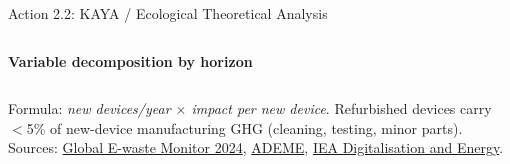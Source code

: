 \documentclass[aspectratio=169]{beamer}
\begin{document}
\begin{frame}{Action 2.2: KAYA / Ecological Theoretical Analysis}
\begin{columns}[T,totalwidth=\textwidth]
\textbf{Variable decomposition by horizon}
\end{columns}
\vspace{0.08cm}
\tiny Formula: \textit{new devices/year $\times$ impact per new device}. Refurbished devices carry $<$5\% of new-device manufacturing GHG (cleaning, testing, minor parts). Sources: \href{https://ewastemonitor.info/the-global-e-waste-monitor-2024/}{Global E-waste Monitor 2024}, \href{https://librairie.ademe.fr/}{ADEME}, \href{https://www.iea.org/reports/digitalisation-and-energy}{IEA Digitalisation and Energy}.
\end{frame}

\end{document}
